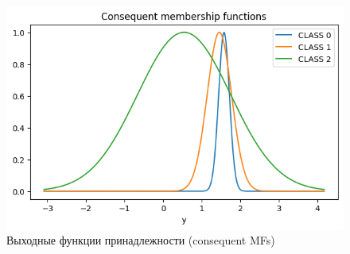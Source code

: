 \begin{figure}[H]
  \centering
  \includegraphics[width=0.7\linewidth]{images/mf_out.png}
  \caption{Выходные функции принадлежности (consequent MFs)}
  \label{fig:mf_out}
\end{figure}

